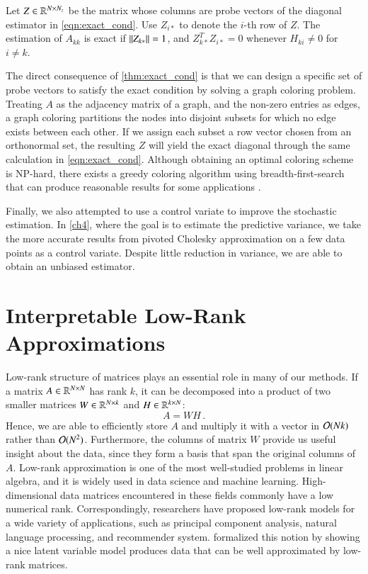 \begin{theorem}\label{thm:exact_cond}
Let $Z\in\mathbb{R}^{N\times N_z}$ be the matrix whose columns are probe vectors of
the diagonal estimator in \cref{eqn:exact_cond}. Use $Z_{i\ast}$ to denote the
$i$\hyp{}th row of $Z$. The estimation of $A_{kk}$ is exact if $\left\lVert Z_
{k\ast}\right\rVert = 1$, and $Z_{k\ast}^TZ_{i\ast} = 0$ whenever $H_{ki}\neq 0$ for $i\neq
k$.
\end{theorem}

The direct consequence of \cref{thm:exact_cond} is that we can design a
specific set of probe vectors to satisfy the exact condition by solving a graph
coloring problem. Treating $A$ as the adjacency matrix of a graph, and the
non\hyp{}zero entries as edges, a graph coloring partitions the nodes into
disjoint subsets for which no edge exists between each other. If we assign each
subset a row vector chosen from an orthonormal set, the resulting $Z$ will yield
the exact diagonal through the same calculation in \cref{eqn:exact_cond}.
Although obtaining an optimal coloring scheme is NP\hyp{}hard, there exists a
greedy coloring algorithm using breadth\hyp{}first\hyp{}search that can produce
reasonable results for some applications \cite[Theorem~28.33]
{arumugam2016handbook}.

Finally, we also attempted to use a control variate to improve the stochastic
estimation. In \cref{ch4}, where the goal is to estimate the predictive
variance, we take the more accurate results from pivoted Cholesky approximation
on a few data points as a control variate. Despite little reduction in variance,
we are able to obtain an unbiased estimator.

\section{Interpretable Low\hyp{}Rank Approximations}\label{pre:lra}

Low\hyp{}rank structure of matrices plays an essential role in many of our
methods. If a matrix $A\in\mathbb{R}^{N\times N}$ has rank $k$, it can be
decomposed into a product of two smaller matrices $W\in\mathbb{R}^{N\times k}$ and
$H\in\mathbb{R}^{k\times N}$:
\begin{equation}\label{eqn:low_rank}
A = WH\,.
\end{equation}
Hence, we are able to efficiently store $A$ and multiply it with a vector in
$\mathcal{O}(Nk)$ rather than $\mathcal{O}(N^2)$. Furthermore, the columns of matrix $W$
provide us useful insight about the data, since they form a basis that span the
original columns of $A$. Low\hyp{}rank approximation is one of the most 
well\hyp{}studied problems in linear algebra, and it is widely used in data
science and machine learning. High\hyp{}dimensional data matrices encountered in
these fields commonly have a low numerical rank. Correspondingly, researchers
have proposed low\hyp{}rank models for a wide variety of applications, such as
principal component analysis, natural language processing, and recommender
system. \citet{udell2019big} formalized this notion by showing a nice latent
variable model produces data that can be well approximated by low\hyp{}rank
matrices.

